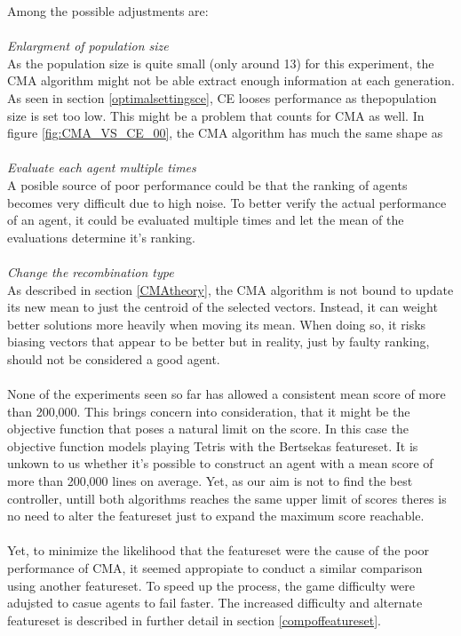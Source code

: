 Among the possible adjustments are:\\
\\
\textit{Enlargment of population size}\\
As the population size is quite small (only around 13)
for this experiment, the CMA algorithm might not be able
extract enough information at each generation. As seen in 
section \ref{optimalsettingsce}, CE looses performance as 
thepopulation size is set too low. This might be a problem 
that counts for CMA as well. In figure \ref{fig:CMA_VS_CE_00},
the CMA algorithm has much the same shape as \\
\\
\textit{Evaluate each agent multiple times}\\
A posible source of poor performance could be 
that the ranking of agents becomes very difficult
due to high noise. To better verify the actual
performance of an agent, it could be evaluated 
multiple times and let the mean of the evaluations
determine it's ranking.\\
\\
\textit{Change the recombination type}\\
As described in section \ref{CMAtheory}, 
the CMA algorithm is not bound to update its 
new mean to just the centroid of the selected 
vectors. Instead, it can weight better solutions
more heavily when moving its mean. When doing so,
it risks biasing vectors that appear to be better 
but in reality, just by faulty ranking, should
not be considered a good agent.\\
\\
None of the experiments seen so far has allowed a consistent mean score of more 
than 200,000. This brings concern into consideration, that it might be the objective function
that poses a natural limit on the score. In this case the objective function
models playing Tetris with the Bertsekas featureset. It is unkown to us
whether it's possible to construct an agent with a mean score of more than
200,000 lines on average. Yet, as our aim is not to find the best controller,
untill both algorithms reaches the same upper limit of scores theres is no need
to alter the featureset just to expand the maximum score reachable.\\
\\
Yet, to minimize the likelihood that the featureset were the cause of the 
poor performance of CMA, it seemed appropiate to conduct a similar comparison 
using another featureset. To speed up the process, the game difficulty were 
adujsted to casue agents to fail faster. The increased difficulty and alternate
featureset is described in further detail in section \ref{compoffeatureset}.

